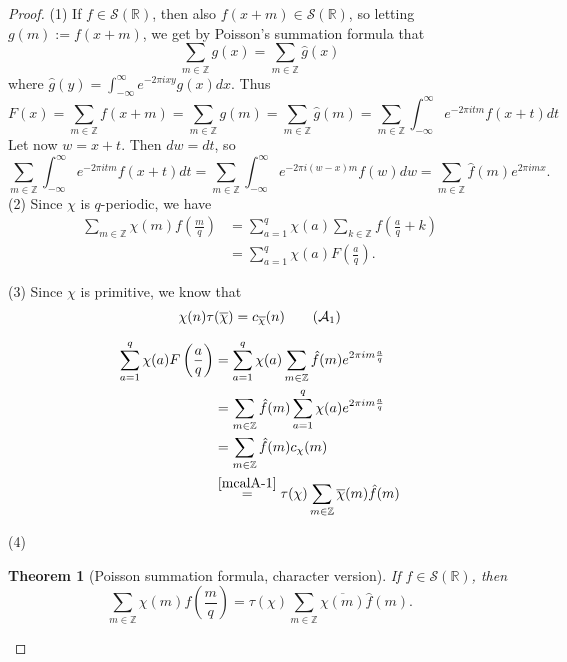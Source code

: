 \documentclass[reqno]{amsart}
\newtheorem{theorem}{Theorem}[section]
\theoremstyle{definition}
\theoremstyle{remark}
\begin{document}
\begin{proof}
    (1) If $f \in \mathcal{S}(\mathbb{R})$, then also
    $f\left( x+m \right) \in \mathcal{S}(\mathbb{R})$,
    so letting $g (m) := f(x+m)$, we get
    by Poisson's summation formula that
    \[
    \sum_{m \in \mathbb{Z}} g(x)
    = \sum_{m \in \mathbb{Z}} \hat{g}(x)
    \] 
    where $
    \hat{g}(y) = \int_{-\infty}^{\infty} 
    e^{-2 \pi i x y }g(x) dx$. Thus
    \[
    F(x) = \sum_{m \in \mathbb{Z}}f(x+m)
    = \sum_{m \in \mathbb{Z}}g(m)
    = \sum_{m \in \mathbb{Z}}
    \hat{g}(m) 
    = \sum_{m \in \mathbb{Z}}
    \int_{-\infty}^{\infty} e^{-2 \pi i t m}
    f(x+t) dt
    \] 
    Let now
    $w = x+t$. Then
    $dw = dt$, so
    \[
    \sum_{m \in \mathbb{Z}}
    \int_{-\infty}^{\infty} e^{-2\pi i t m}
    f(x+t) dt
    = \sum_{m \in \mathbb{Z}}
    \int_{-\infty}^{\infty} 
    e^{-2 \pi i (w-x) m} f(w) dw
    = \sum_{m \in \mathbb{Z}} \hat{f}(m) e^{2 \pi i m x}.
    \] 
    (2) Since $
    \chi$ is $q$-periodic, we have
    \begin{align*}
        \sum_{m \in \mathbb{Z}}\chi(m) f\left( \frac{m}{q} \right) 
        &= \sum_{a=1}^{q}
        \chi (a) \sum_{k \in \mathbb{Z}}
        f \left( \frac{a}{q} + k \right) \\
        &= \sum_{a=1}^{q}
        \chi(a) F \left( \frac{a}{q} \right) .
    \end{align*}

    (3) Since $\chi$ is primitive, we know that
    \[
    \chi(n) \tau (\overline{\chi}) =
    c_{\overline{\chi}}(n) \tag{$\mathcal{A}_1$} \label{mcalA-1}
    \] 

    \begin{align*}
        \sum_{a=1}^{q}\chi(a) F\left( \frac{a}{q} \right) 
        &= \sum_{a=1}^{q} \chi (a)
        \sum_{m \in \mathbb{Z}} \hat{f}(m) e^{2\pi i m \frac{a}{q}}\\
        &= \sum_{m \in \mathbb{Z}}
        \hat{f}(m) \sum_{a=1}^{q}
        \chi(a)  e^{2 \pi i m \frac{a}{q}}\\
        &= \sum_{m \in \mathbb{Z}} \hat{f}(m)
        c_{\chi}(m)\\
        &\stackrel{\eqref{mcalA-1}}{=} 
        \tau (\chi) \sum_{m \in \mathbb{Z}}
         \overline{\chi}(m) \hat{f}(m)
    \end{align*}

    (4) 

    \begin{theorem}[Poisson summation formula, character
        version]\label{Poisson-summation-character}
    If $f \in \mathcal{S}(\mathbb{R})$, then
    \[
    \sum_{m \in \mathbb{Z}} 
    \chi(m) f \left( \frac{m}{q} \right) =
    \tau(\chi) \sum_{m \in \mathbb{Z}}
    \overline{\chi(m)} \hat{f}(m).
    \] 
    \end{theorem}


\end{proof}
\end{document}
